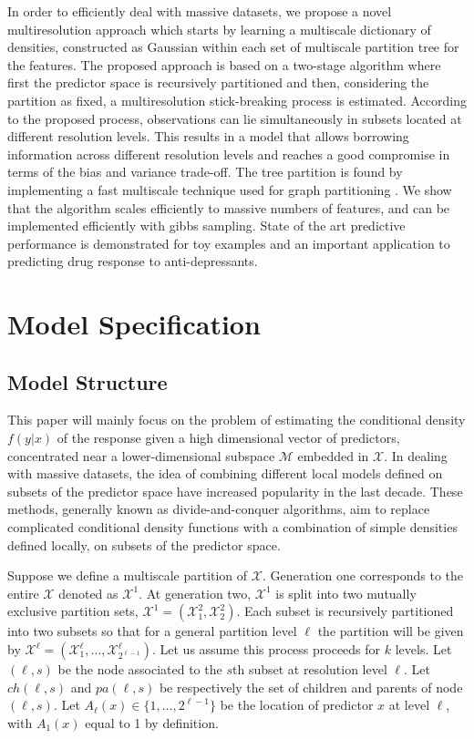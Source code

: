 \documentclass{article}
\begin{document}
 In order to efficiently deal with massive datasets, we propose a novel multiresolution approach which starts by learning a multiscale dictionary of densities, constructed as Gaussian within each set of multiscale partition tree for the features. The proposed approach is based on a two-stage algorithm where first the predictor space is recursively partitioned and then, considering the partition as fixed, a multiresolution stick-breaking process is estimated. According to the proposed process, observations can lie simultaneously in subsets located at different resolution levels. This results in a model that allows borrowing information across different resolution levels and reaches a good compromise in terms of the bias and variance trade-off. The tree partition is found by implementing a fast multiscale technique used for graph partitioning \cite{metis}.  We show that the algorithm scales efficiently to massive numbers of features, and can be implemented efficiently with gibbs sampling.  State of the art predictive performance is demonstrated for toy examples and an important application to predicting drug response to anti-depressants.

 
 
\section{Model Specification}

\subsection{ Model Structure} %
This paper will mainly focus on the problem of estimating the conditional density $f(y|x)$ of the response given a high dimensional vector of predictors, concentrated near a lower-dimensional subspace $\mathcal{M}$ embedded in $\mathcal{X}$. In dealing with massive datasets, the idea of combining different local models defined on subsets of the predictor space have increased popularity in the last decade. These methods, generally known as divide-and-conquer algorithms, aim to replace complicated conditional density functions with a combination of simple densities defined locally, on subsets of the predictor space.

Suppose we define a multiscale partition of $\mathcal{X}$.  Generation one corresponds to the entire $\mathcal{X}$ denoted as $\mathcal{X}^1$.  At generation two, $\mathcal{X}^1$ is split into two mutually exclusive partition sets, $\mathcal{X}^1=\left(\mathcal{X}^2_1, \mathcal{X}^2_2\right)$. Each subset is recursively partitioned into two subsets so that for a general partition level $\ell$ the partition will be given by $\mathcal{X}^{\ell}=\left(\mathcal{X}^{\ell}_1, \ldots, \mathcal{X}^{\ell}_{2^{\ell-1}}\right)$. Let us assume this process proceeds for $k$ levels. Let $(\ell,s)$ be the node associated to the $s$th subset at resolution level $\ell$. Let $ch(\ell,s)$ and $pa(\ell,s)$ be respectively the set of children and parents of node $(\ell, s)$. Let $A_{\ell}(x) \in \{1, \ldots, 2^{\ell-1}\}$ be the location of predictor $x$ at level $\ell$, with $A_1(x)$ equal to 1 by definition. 
\end{document}
